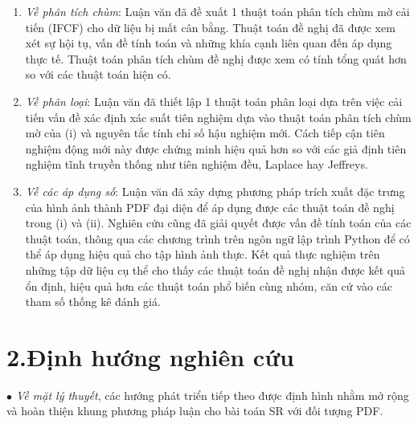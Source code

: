 \documentclass[a4paper,oneside]{book} %
\theoremstyle{plain}
\theoremstyle{plain}
\theoremstyle{nonumberplain}
\begin{document}
\begin{enumerate}[label=(\roman*), leftmargin=2em, itemsep=1ex]
	\item \textit{Về phân tích chùm}: Luận văn đã đề xuất 1 thuật toán phân tích chùm mờ cải tiến (IFCF) cho dữ liệu bị mất cân bằng. Thuật toán đề nghị đã được xem xét sự hội tụ, vấn đề tính toán và những khía cạnh liên quan đến áp dụng thực tế. Thuật toán phân tích chùm đề nghị được xem có tính tổng quát hơn so với các thuật toán hiện có.
	\item \textit{Về phân loại}: Luận văn đã thiết lập 1 thuật toán phân loại dựa trên việc cải tiến vấn đề xác định xác suất tiên nghiệm dựa vào thuật toán phân tích chùm mờ của (i) và nguyên tắc tính chỉ số hậu nghiệm mới. Cách tiếp cận tiên nghiệm động mới này được chứng minh hiệu quả hơn so với các giả định tiên nghiệm tĩnh truyền thống như tiên nghiệm đều, Laplace hay Jeffreys.
	\item \textit{Về các áp dụng số}: Luận văn đã xây dựng phương pháp trích xuất đặc trưng của hình ảnh thành PDF đại diện để áp dụng được các thuật toán đề nghị trong (i) và (ii). Nghiên cứu cũng đã giải quyết được vấn đề tính toán của các thuật toán, thông qua các chương trình trên ngôn ngữ lập trình Python để có thể áp dụng hiệu quả cho tập hình ảnh thực. Kết quả thực nghiệm trên những tập dữ liệu cụ thể cho thấy các thuật toán đề nghị nhận được kết quả ổn định, hiệu quả hơn các thuật toán phổ biến cùng nhóm, căn cứ vào các tham số thống kê đánh giá.
\end{enumerate}



\section*{2.\quad Định hướng nghiên cứu}

\textit{$\bullet$ Về mặt lý thuyết}, các hướng phát triển tiếp theo được định hình nhằm mở rộng và hoàn thiện khung phương pháp luận cho bài toán SR với đối tượng PDF.
\end{document}
